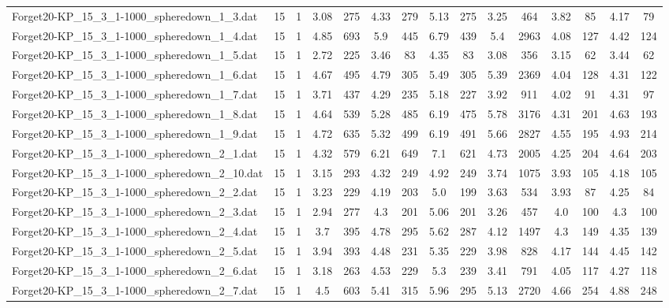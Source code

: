 \begin{table}[!ht]
{\begin{tabular}{lcccccccccccccc}
Forget20-KP\_15\_3\_1-1000\_spheredown\_1\_3.dat & 15 & 1 & 3.08 & 275 & 4.33 & 279 & 5.13 & 275 & 3.25 & 464 & 3.82 & 85 & 4.17 & 79 \\
Forget20-KP\_15\_3\_1-1000\_spheredown\_1\_4.dat & 15 & 1 & 4.85 & 693 & 5.9 & 445 & 6.79 & 439 & 5.4 & 2963 & 4.08 & 127 & 4.42 & 124 \\
Forget20-KP\_15\_3\_1-1000\_spheredown\_1\_5.dat & 15 & 1 & 2.72 & 225 & 3.46 & 83 & 4.35 & 83 & 3.08 & 356 & 3.15 & 62 & 3.44 & 62 \\
Forget20-KP\_15\_3\_1-1000\_spheredown\_1\_6.dat & 15 & 1 & 4.67 & 495 & 4.79 & 305 & 5.49 & 305 & 5.39 & 2369 & 4.04 & 128 & 4.31 & 122 \\
Forget20-KP\_15\_3\_1-1000\_spheredown\_1\_7.dat & 15 & 1 & 3.71 & 437 & 4.29 & 235 & 5.18 & 227 & 3.92 & 911 & 4.02 & 91 & 4.31 & 97 \\
Forget20-KP\_15\_3\_1-1000\_spheredown\_1\_8.dat & 15 & 1 & 4.64 & 539 & 5.28 & 485 & 6.19 & 475 & 5.78 & 3176 & 4.31 & 201 & 4.63 & 193 \\
Forget20-KP\_15\_3\_1-1000\_spheredown\_1\_9.dat & 15 & 1 & 4.72 & 635 & 5.32 & 499 & 6.19 & 491 & 5.66 & 2827 & 4.55 & 195 & 4.93 & 214 \\
Forget20-KP\_15\_3\_1-1000\_spheredown\_2\_1.dat & 15 & 1 & 4.32 & 579 & 6.21 & 649 & 7.1 & 621 & 4.73 & 2005 & 4.25 & 204 & 4.64 & 203 \\
Forget20-KP\_15\_3\_1-1000\_spheredown\_2\_10.dat & 15 & 1 & 3.15 & 293 & 4.32 & 249 & 4.92 & 249 & 3.74 & 1075 & 3.93 & 105 & 4.18 & 105 \\
Forget20-KP\_15\_3\_1-1000\_spheredown\_2\_2.dat & 15 & 1 & 3.23 & 229 & 4.19 & 203 & 5.0 & 199 & 3.63 & 534 & 3.93 & 87 & 4.25 & 84 \\
Forget20-KP\_15\_3\_1-1000\_spheredown\_2\_3.dat & 15 & 1 & 2.94 & 277 & 4.3 & 201 & 5.06 & 201 & 3.26 & 457 & 4.0 & 100 & 4.3 & 100 \\
Forget20-KP\_15\_3\_1-1000\_spheredown\_2\_4.dat & 15 & 1 & 3.7 & 395 & 4.78 & 295 & 5.62 & 287 & 4.12 & 1497 & 4.3 & 149 & 4.35 & 139 \\
Forget20-KP\_15\_3\_1-1000\_spheredown\_2\_5.dat & 15 & 1 & 3.94 & 393 & 4.48 & 231 & 5.35 & 229 & 3.98 & 828 & 4.17 & 144 & 4.45 & 142 \\
Forget20-KP\_15\_3\_1-1000\_spheredown\_2\_6.dat & 15 & 1 & 3.18 & 263 & 4.53 & 229 & 5.3 & 239 & 3.41 & 791 & 4.05 & 117 & 4.27 & 118 \\
Forget20-KP\_15\_3\_1-1000\_spheredown\_2\_7.dat & 15 & 1 & 4.5 & 603 & 5.41 & 315 & 5.96 & 295 & 5.13 & 2720 & 4.66 & 254 & 4.88 & 248 \\

\end{tabular}}
\end{table}
